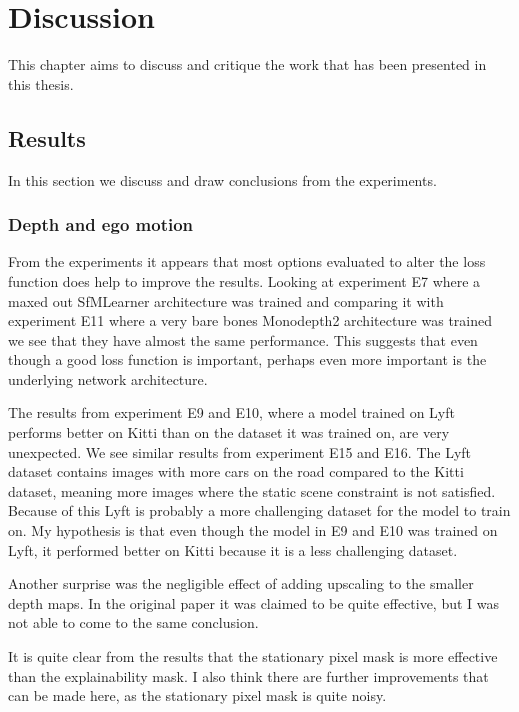\chapter{Discussion}\label{cha:discussion}

This chapter aims to discuss and critique the work that has been presented in this thesis. 

\section{Results}

In this section we discuss and draw conclusions from the experiments.

\subsection{Depth and ego motion}

From the experiments it appears that most options evaluated to alter the loss function does help to improve the results. Looking at experiment E7 where a maxed out SfMLearner architecture was trained and comparing it with experiment E11 where a very bare bones Monodepth2 architecture was trained we see that they have almost the same performance. This suggests that even though a good loss function is important, perhaps even more important is the underlying network architecture.

The results from experiment E9 and E10, where a model trained on Lyft performs better on Kitti than on the dataset it was trained on, are very unexpected. We see similar results from experiment E15 and E16. The Lyft dataset contains images with more cars on the road compared to the Kitti dataset, meaning more images where the static scene constraint is not satisfied. Because of this Lyft is probably a more challenging dataset for the model to train on. My hypothesis is that even though the model in E9 and E10 was trained on Lyft, it performed better on Kitti because it is a less challenging dataset.

Another surprise was the negligible effect of adding upscaling to the smaller depth maps. In the original paper it was claimed to be quite effective, but I was not able to come to the same conclusion.

It is quite clear from the results that the stationary pixel mask is more effective than the explainability mask. I also think there are further improvements that can be made here, as the stationary pixel mask is quite noisy.

